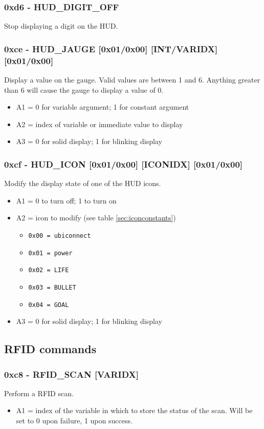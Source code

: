 \documentclass[12pt,a4paper]{scrbook}
\begin{document}
\subsubsection{0xd6 - HUD\_DIGIT\_OFF}
Stop displaying a digit on the HUD.



\subsubsection{0xce - HUD\_JAUGE [0x01/0x00] [INT/VARIDX] [0x01/0x00]}
Display a value on the gauge.  Valid values are between 1 and 6.  Anything greater
than 6 will cause the gauge to display a value of 0.  
\begin{itemize}
\item A1 = 0 for variable argument; 1 for constant argument
\item A2 = index of variable or immediate value to display
\item A3 = 0 for solid display; 1 for blinking display
\end{itemize}


\subsubsection{0xcf - HUD\_ICON [0x01/0x00] [ICONIDX] [0x01/0x00]}
Modify the display state of one of the HUD icons. 
\begin{itemize}
\item A1 = 0 to turn off; 1 to turn on
\item A2 = icon to modify (see table \ref{sec:iconconstants})
\begin{itemize}
\item \texttt{0x00 = ubiconnect}
\item \texttt{0x01 = power}
\item \texttt{0x02 = LIFE}
\item \texttt{0x03 = BULLET}
\item \texttt{0x04 = GOAL}
\end{itemize}
\item A3 = 0 for solid display; 1 for blinking display
\end{itemize}


\subsection{RFID commands}

\subsubsection{0xc8 - RFID\_SCAN [VARIDX]}
Perform a RFID scan.
\begin{itemize}
\item A1 = index of the variable in which to store the status of the scan.  Will be set to 0 
		upon failure, 1 upon success.
\end{itemize}
\end{document}
